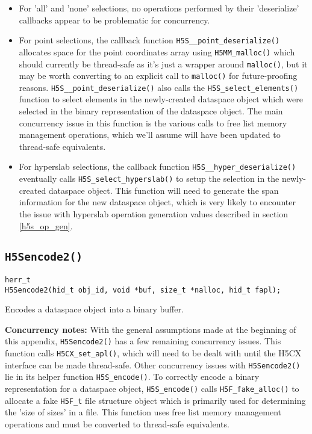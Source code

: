 \documentclass[../HDF5_RFC.tex]{subfiles}
\begin{document}
\begin{itemize}
    \item For 'all' and 'none' selections, no operations performed by their 'deserialize' callbacks
          appear to be problematic for concurrency.
    \item For point selections, the callback function \texttt{H5S\_\_point\_deserialize()} allocates
          space for the point coordinates array using \texttt{H5MM\_malloc()} which should currently
          be thread-safe as it's just a wrapper around \texttt{malloc()}, but it may be worth
          converting to an explicit call to \texttt{malloc()} for future-proofing reasons.
          \texttt{H5S\_\_point\_deserialize()} also calls the \texttt{H5S\_select\_elements()} function
          to select elements in the newly-created dataspace object which were selected in the binary representation of the dataspace object. The main concurrency issue in this function is the
          various calls to free list memory management operations, which we'll assume will have been
          updated to thread-safe equivalents.
    \item For hyperslab selections, the callback function \texttt{H5S\_\_hyper\_deserialize()} eventually
          calls \texttt{H5S\_select\_hyperslab()} to setup the selection in the newly-created dataspace
          object. This function will need to generate the span information for the new dataspace object,
          which is very likely to encounter the issue with hyperslab operation generation values described
          in section \ref{h5s_op_gen}.
\end{itemize}

\subsection{\texttt{H5Sencode2()}}
\label{apdx:h5s_func_h5sencode2}

\begin{verbatim}
herr_t
H5Sencode2(hid_t obj_id, void *buf, size_t *nalloc, hid_t fapl);
\end{verbatim}

Encodes a dataspace object into a binary buffer.

\textbf{Concurrency notes:} With the general assumptions made at the beginning of this
appendix, \texttt{H5Sencode2()} has a few remaining concurrency issues. This function
calls \texttt{H5CX\_set\_apl()}, which will need to be dealt with until the H5CX interface can
be made thread-safe. Other concurrency issues with \texttt{H5Sencode2()} lie in its helper function
\texttt{H5S\_encode()}. To correctly encode a binary representation for a dataspace object,
\texttt{H5S\_encode()} calls \texttt{H5F\_fake\_alloc()} to allocate a fake \texttt{H5F\_t} file
structure object which is primarily used for determining the 'size of sizes' in a file. This
function uses free list memory management operations and must be converted to thread-safe equivalents.
\end{document}
